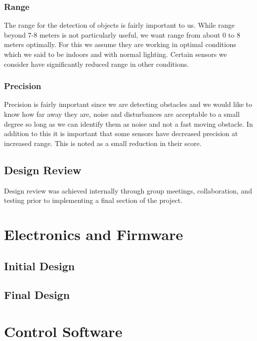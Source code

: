 \documentclass[oneside,final,a4paper]{report}
\begin{document}
\subsection{Range}
The range for the detection of objects is fairly important to us. While range beyond 7-8 meters is not particularly useful, we want range from about 0 to 8 meters optimally. For this we assume they are working in optimal conditions which we said to be indoors and with normal lighting. Certain sensors we consider have significantly reduced range in other conditions.

\subsection{Precision}
Precision is fairly important since we are detecting obstacles and we would like to know how far away they are, noise and disturbances are acceptable to a small degree so long as we can identify them as noise and not a fast moving obstacle. In addition to this it is important that some sensors have decreased precision at increased range. This is noted as a small reduction in their score.

\section{Design Review}
Design review was achieved internally through group meetings, collaboration, and testing prior to implementing a final section of the project.


\chapter{Electronics and Firmware}

\section{Initial Design}

\section{Final Design}


\chapter{Control Software}
\end{document}
